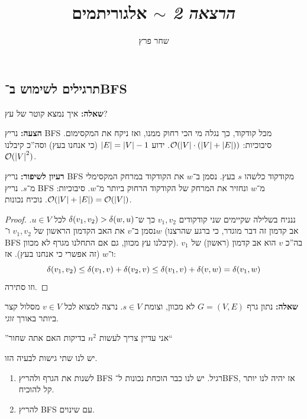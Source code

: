 \documentclass[]{../../../../tex/classes/styledArticle}
\author{שחר פרץ}
\title{\textit{הרצאה 2} $\sim$ אלגוריתמים}
\begin{document}
	\maketitle
	
	
	\subsection*{תרגילים לשימוש ב־BFS}
	\textbf{שאלה: }איך נמצא קוטר של עץ? 
	
	\textbf{הצעה: }נריץ BFS מכל קודקוד, כך נגלה מי הכי רחוק ממנו, ואז ניקח את המקסימום. סיבוכיות: $\mathcal{O}(\left \lvert V \right \rvert \cdot (\left \lvert V \right \rvert + \left \lvert E \right \rvert))$. ידוע $\left \lvert E \right \rvert = \left \lvert V \right \rvert - 1$ (כי אנחנו בעץ) וסה''כ קיבלנו $\mathcal{O}(\left \lvert V \right \rvert^{2})$. 
	
	\textbf{רעיון לשיפור: }נריץ BFS מקודקוד כלשהו $s$ בעץ. נסמן ב־$w$ את הקודקוד במרחק המקסימלי מ־$s$. נריץ BFS מ־$w$ ונחזיר את המרחק של הקודקוד הרחוק ביותר מ־$w$. סיבוכיות: $\mathcal{O}(\left \lvert V \right \rvert + \left \lvert E \right \rvert) = \mathcal{O}(\left \lvert V \right \rvert)$. נוכיח נכונות. \begin{proof}
		ננניח בשלילה שקיימים שני קודקודים $v_1, v_2$ כך ש־$\delta(v_1, v_2) > \delta(w, u)$ לכל $u \in V$. נסמן ב־$v$ את האב הקדמון הראשון של $v_1, v_2$ ו־$w$ (אב קדמון זה דבר מוגדר, כי ברגע שהרצנו BFS קיבלנו עץ מכוון, גם אם התחלנו מגרף לא מכוון). בה''כ $v$ הוא אב קדמון (ראשון) של $v_1$ ו־$w$ (זה אפשרי כי אנחנו בעץ). אז: 
		\[ \delta(v_1, v_2) \le \delta(v_1, v) + \delta(v_2, v) \le \delta(v_1, v) + \delta(v, w) = \delta(v_1, w) \]
		וזו סתירה. 
	\end{proof}
	
	\textbf{שאלה: }נתון גרף $G = (V, E)$ לא מכוון, וצומת $s \in V$. נרצה למצוא לכל $v \in V$ מסלול קצר ביותר באורך \textit{זוגי}. 
	
	
	''אני עדיין צריך לעשות $n^{2}$ בדיקות האם אתה שחור``
	
	יש לנו שתי גישות לבעיה הזו. 
	\begin{enumerate}
		\item לשנות את הגרף ולהריץ BFS רגיל. יש לנו כבר הוכחת נכונות ל־BFS, אז יהיה לנו יותר קל להוכיח. 
		\item להריץ BFS עם שינוים. 
	\end{enumerate}
	
\end{document}
